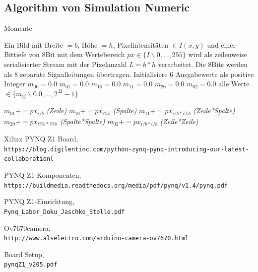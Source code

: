 \documentclass[a4paper]{report}
\begin{document}
\subsection{Algorithm von Simulation Numeric}
\begin{algorithm}
\caption{Momente}
\label{Momente}
\begin{algorithmic}[1]
\Require Ein Bild mit Breite {$=b$}, Höhe {$=h$}, Pixelintensitäten {$\in I(x,y)$} und einer Bittiefe von 8Bit mit dem Wertebereich {$px\in \{I\backslash0,...,255\}$} wird als zeilenweise serialisierter Stream mit der Pixelanzahl {$L=b*h$} verarbeitet. Die 8Bits werden als 8 separate Signalleitungen übertragen.  Initialisiere 6 Ausgabewerte als positive Integer {$m_{00}=0.0$} {$m_{01}=0.0$} {$m_{10}=0.0$} {$m_{11}=0.0$} {$m_{20}=0.0$} {$m_{02}=0.0$} alle Werte {$\in \{m_{ij}\backslash0.0,...,2^{32}-1\}$}

	    \State $m_{01}+= px_{i/b}$ \textit{(Zeile)}
    	\State $m_{10}+=px_{i\%b}$ \textit{(Spalte)}
    	\State $m_{11}+=px_{i/b * i\%b}$ \textit{(Zeile*Spalte)}
    	\State $m_{20}+=px_{i\%b * i\%b}$ \textit{(Spalte*Spalte)}
    	\State $m_{02}+=px_{i/b * i/b}$ \textit{(Zeile*Zeile)}
    \EndIf
\EndFor
\end{algorithmic}
\end{algorithm}




\begin{thebibliography}{9}

Xilinx PYNQ Z1 Board,
\\\texttt{https://blog.digilentinc.com/python-zynq-pynq-introducing-our-latest-collaborationl}

PYNQ Z1-Komponenten,
\\\texttt{https://buildmedia.readthedocs.org/media/pdf/pynq/v1.4/pynq.pdf}

PYNQ Z1-Einrichtung,
\\\texttt{Pynq{\_}Labor{\_}Doku{\_}Jaschko{\_}Stolle.pdf}

Ov7670camera,
\\\texttt{http://www.alselectro.com/arduino-camera-ov7670.html}

Board Setup,
\\\texttt{pynqZ1{\_}v205.pdf}
\end{thebibliography}
\end{document}
